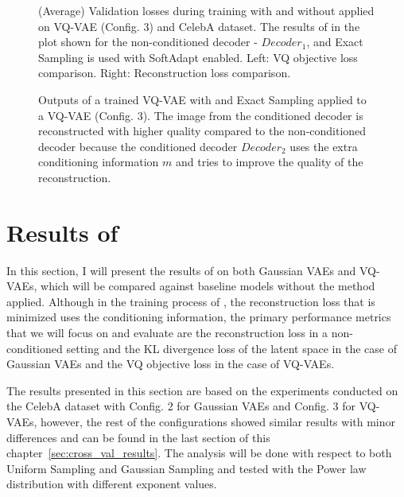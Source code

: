 \begin{figure}[H]
    \centering
    \scalebox{0.48}{}
    \scalebox{0.48}{}
    \caption[Validation loss comparison during training of a Gaussian VAE.]
    {
        (Average) Validation losses during training with and without  applied on VQ-VAE (Config. 3) and CelebA dataset. The results of  in the plot shown for the non-conditioned decoder - $Decoder_1$, and Exact Sampling is used with SoftAdapt enabled.
        Left: VQ objective loss comparison. Right: Reconstruction loss comparison.
    }
    \label{fig:results_method1_vq_vae}
\end{figure}

\begin{figure}[H]
    \centering
    
    \caption[Trained neural network with  applied to a VQ-VAE.]
    {
        Outputs of a trained VQ-VAE with  and Exact Sampling applied to a VQ-VAE (Config. 3). The image from the conditioned decoder is reconstructed with higher quality compared to the non-conditioned decoder because the conditioned decoder $Decoder_2$ uses the extra conditioning information $m$ and tries to improve the quality of the reconstruction.
    }
    \label{fig:rec_vqvae}
\end{figure}


\section{Results of }

In this section, I will present the results of  on both Gaussian VAEs and VQ-VAEs, which will be compared against baseline models without the method applied. Although in the training process of , the reconstruction loss that is minimized uses the conditioning information, the primary performance metrics that we will focus on and evaluate are the reconstruction loss in a non-conditioned setting and the KL divergence loss of the latent space in the case of Gaussian VAEs and the VQ objective loss in the case of VQ-VAEs.

The results presented in this section are based on the experiments conducted on the CelebA dataset with Config. 2 for Gaussian VAEs and Config. 3 for VQ-VAEs, however, the rest of the configurations showed similar results with minor differences and can be found in the last section of this chapter~\ref{sec:cross_val_results}. The analysis will be done with respect to both Uniform Sampling and Gaussian Sampling and tested with the Power law distribution with different exponent values.

